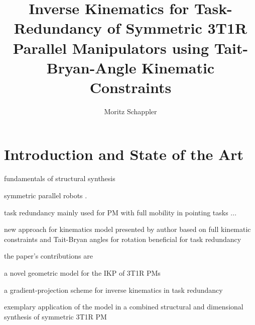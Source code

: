 \documentclass[
	graybox,
	vecphys] %
	{svmult}
\begin{document}
\title*{Inverse Kinematics for Task-Redundancy of Symmetric 3T1R Parallel Manipulators using Tait-Bryan-Angle Kinematic Constraints}
\author{Moritz Schappler}


\maketitle
\vspace{-2.5cm} %


\section{Introduction and State of the Art}
\label{sec:introduction}

fundamentals of structural synthesis \cite{Gogu2008,KongGos2007}

symmetric parallel robots \cite{FangTsa2002,HuangLi2003}.

task redundancy mainly used for PM with full mobility in pointing tasks ...

new approach for kinematics model presented by author based on full kinematic constraints and Tait-Bryan angles for rotation beneficial for task redundancy \cite{SchapplerTapOrt2019}

the paper's contributions are
\begin{compactitem}
\item a novel geometric model for the IKP of 3T1R PMs 
\item a gradient-projection scheme for inverse kinematics in task redundancy
\item exemplary application of the model in a combined structural and dimensional synthesis of symmetric 3T1R PM
\end{compactitem}
\end{document}
